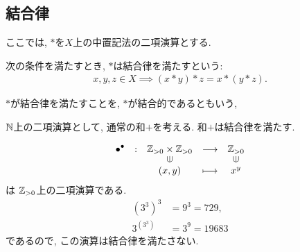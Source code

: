 \subsection{結合律}
ここでは,
$\ast$を$X$上の中置記法の二項演算とする.
\begin{definition}
  次の条件を満たすとき,
  $\ast$は結合律を満たすという:
  \begin{align*}
    x,y,z\in X\implies (x\ast y)\ast z = x\ast (y\ast z).
  \end{align*}
\end{definition}
\begin{remark}
  $\ast$が結合律を満たすことを,
  $\ast$が結合的であるともいう,
\end{remark}
\begin{example}
  $\mathbb{N}$上の二項演算として,
  通常の和$+$を考える.
  和$+$は結合律を満たす.
\end{example}
\begin{nonexample}
\begin{align*}
  \shazo{\bullet^\bullet}
        {\ZZ_{>0}\times \ZZ_{>0}}{\ZZ_{>0}}
        {(x,y)}{x^y}
\end{align*}
は
$\mathbb{Z}_{>0}$上の二項演算である.
\begin{align*}
  (3^3)^3&=9^3=729,\\
  3^{(3^3)}&=3^9=19683
\end{align*}
であるので,
この演算は結合律を満たさない.
\end{nonexample}

